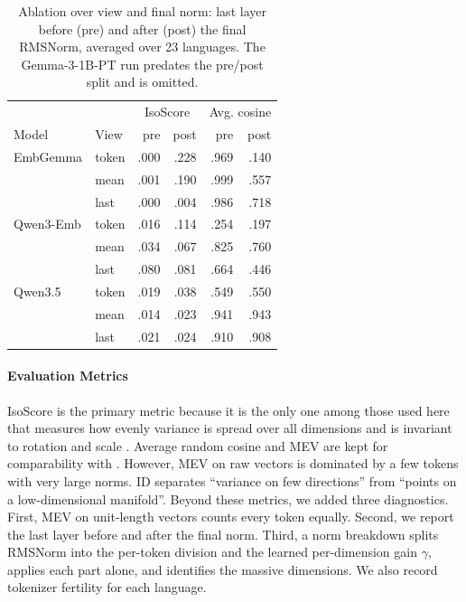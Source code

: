 \begin{table}[t]
\centering
\small
\begin{tabular}{llrrrr}
\toprule
 & & \multicolumn{2}{c}{IsoScore} & \multicolumn{2}{c}{Avg. cosine} \\
Model & View & pre & post & pre & post \\
\midrule
EmbGemma & token & .000 & .228 & .969 & .140 \\
 & mean & .001 & .190 & .999 & .557 \\
 & last & .000 & .004 & .986 & .718 \\
\midrule
Qwen3-Emb & token & .016 & .114 & .254 & .197 \\
 & mean & .034 & .067 & .825 & .760 \\
 & last & .080 & .081 & .664 & .446 \\
\midrule
Qwen3.5 & token & .019 & .038 & .549 & .550 \\
 & mean & .014 & .023 & .941 & .943 \\
 & last & .021 & .024 & .910 & .908 \\
\bottomrule
\end{tabular}
\caption{Ablation over view and final norm: last layer before (pre) and after (post) the final RMSNorm, averaged over 23 languages. The Gemma-3-1B-PT run predates the pre/post split and is omitted.}
\label{tab:app1_ablation}
\end{table}

\paragraph{Evaluation Metrics}
IsoScore is the primary metric because it is the only one among those used here that measures how evenly variance is spread over all dimensions and is invariant to rotation and scale \citep{rudman-etal-2022-isoscore}. Average random cosine and MEV are kept for comparability with \citet{ethayarajh-2019-contextual}. However, MEV on raw vectors is dominated by a few tokens with very large norms. ID separates ``variance on few directions'' from ``points on a low-dimensional manifold''. Beyond these metrics, we added three diagnostics. First, MEV on unit-length vectors counts every token equally. Second, we report the last layer before and after the final norm. Third, a norm breakdown splits RMSNorm into the per-token division and the learned per-dimension gain $\gamma$, applies each part alone, and identifies the massive dimensions. We also record tokenizer fertility for each language.

